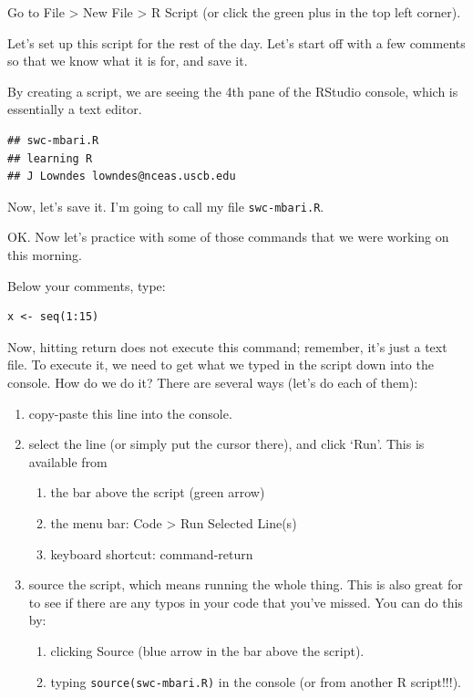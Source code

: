 \documentclass[]{book}
\providecommand{\tightlist}{%
  \setlength{\itemsep}{0pt}\setlength{\parskip}{0pt}}
\theoremstyle{definition}
\theoremstyle{definition}
\theoremstyle{definition}
\theoremstyle{remark}
\begin{document}
Go to File \textgreater{} New File \textgreater{} R Script (or click the
green plus in the top left corner).

Let's set up this script for the rest of the day. Let's start off with a
few comments so that we know what it is for, and save it.

By creating a script, we are seeing the 4th pane of the RStudio console,
which is essentially a text editor.

\begin{verbatim}
## swc-mbari.R
## learning R
## J Lowndes lowndes@nceas.uscb.edu
\end{verbatim}

Now, let's save it. I'm going to call my file \texttt{swc-mbari.R}.

OK. Now let's practice with some of those commands that we were working
on this morning.

Below your comments, type:

\begin{verbatim}
x <- seq(1:15)
\end{verbatim}

Now, hitting return does not execute this command; remember, it's just a
text file. To execute it, we need to get what we typed in the script
down into the console. How do we do it? There are several ways (let's do
each of them):

\begin{enumerate}
\def\labelenumi{\arabic{enumi}.}
\tightlist
\item
  copy-paste this line into the console.
\item
  select the line (or simply put the cursor there), and click `Run'.
  This is available from

  \begin{enumerate}
  \def\labelenumii{\alph{enumii}.}
  \tightlist
  \item
    the bar above the script (green arrow)
  \item
    the menu bar: Code \textgreater{} Run Selected Line(s)
  \item
    keyboard shortcut: command-return
  \end{enumerate}
\item
  source the script, which means running the whole thing. This is also
  great for to see if there are any typos in your code that you've
  missed. You can do this by:

  \begin{enumerate}
  \def\labelenumii{\alph{enumii}.}
  \tightlist
  \item
    clicking Source (blue arrow in the bar above the script).
  \item
    typing
    \texttt{source(\textquotesingle{}swc-mbari.R\textquotesingle{})} in
    the console (or from another R script!!!).
  \end{enumerate}
\end{enumerate}
\end{document}
